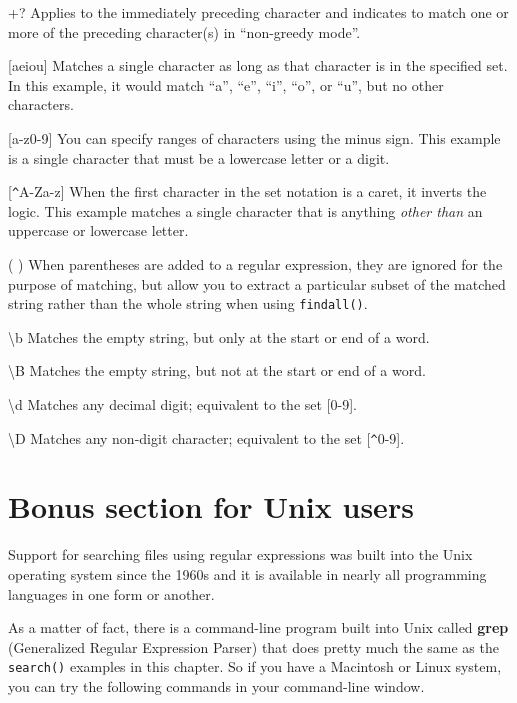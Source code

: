 +? \newline
Applies to the immediately preceding character and indicates to match one or more of the 
preceding character(s) in ``non-greedy mode''.

[aeiou] \newline
Matches a single character as long as that character is in the specified set.  In this example,
it would match ``a'', ``e'', ``i'', ``o'', or ``u'', but no other characters.

[a-z0-9] \newline
You can specify ranges of characters using the minus sign.  This example is a single character
that must be a lowercase letter or a digit.

[\verb"^"A-Za-z] \newline
When the first character in the set notation is a caret, it inverts the logic.  This example
matches a single character that is anything {\em other than} an uppercase or lowercase letter.

( ) \newline
When parentheses are added to a regular expression, they are ignored for the purpose of matching,
but allow you to extract a particular subset of the matched string rather than the whole string
when using {\tt findall()}.

{\textbackslash}b \newline
Matches the empty string, but only at the start or end of a word.

{\textbackslash}B \newline
Matches the empty string, but not at the start or end of a word.

{\textbackslash}d \newline
Matches any decimal digit; equivalent to the set [0-9].

{\textbackslash}D \newline
Matches any non-digit character; equivalent to the set [\verb"^"0-9].

\section{Bonus section for Unix users}

Support for searching files using regular expressions was built into the Unix operating system 
since the 1960s and it is available in nearly all programming languages in one form or another.

As a matter of fact, there is a command-line program built into Unix 
called {\bf grep} (Generalized Regular Expression Parser) that does pretty much 
the same as the {\tt search()} examples in this chapter.  So if you have a 
Macintosh or Linux system, you can try the following commands in your command-line window.

